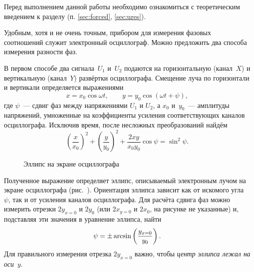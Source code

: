 \label{lab:phase}



Перед выполнением данной работы необходимо ознакомиться с теоретическим
введением к разделу (п. \ref{sec:forced}, \ref{sec:ures}).

Удобным, хотя и не очень точным, прибором для измерения фазовых соотношений 
служит электронный осциллограф. Можно предложить два способа измерения разности фаз.

В первом способе два сигнала~$U_1$ и~$U_2$ подаются 
на горизонтальную (канал~$X$) и вертикальную (канал~$Y$) развёртки осциллографа. 
Смещение луча по горизонтали и вертикали определяется выражениями
\begin{equation*}
x=x_0\cos\omega t,\qquad y=y_0\cos(\omega t+\psi),
\end{equation*}
где $\psi$~--- сдвиг фаз между напряжениями $U_1$ и $U_2$, а $x_0$ и~$y_0$~---
амплитуды напряжений, умноженные на
коэффициенты усиления соответствующих каналов осциллографа. Исключив время,
после несложных преобразований найдём
\begin{equation*}
\left(\frac{x}{x_0}\right)^2+ \left(\frac{y}{y_0}\right)^2+ \frac{2xy}{x_0 y_0}
\cos\psi=\sin^2 \psi.
\end{equation*}

\begin{wrapfigure}[13]{o}{0.45\linewidth}
	\caption{Эллипс на экране осциллографа}
\end{wrapfigure}

Полученное выражение определяет эллипс, описываемый электронным лучом на 
экране осциллографа (рис.~). Ориентация эллипса зависит как от искомого 
угла~$\psi$, так и от усиления каналов осциллографа. Для расчёта сдвига фаз 
можно измерить отрезки $2y_{x=0}$ и $2y_0$ (или $2x_{y=0}$ и $2x_0$, 
на рисунке не указанные) и, подставляя эти значения в уравнение эллипса, найти
\begin{equation}
\eqmark{phasexy}
\psi=\pm\arcsin\left(\frac{y_{x=0}}{y_0}\right).
\end{equation}
Для правильного измерения отрезка $2y_{x=0}$ важно, чтобы 
\emph{центр     эллипса лежал на оси~$y$}.

